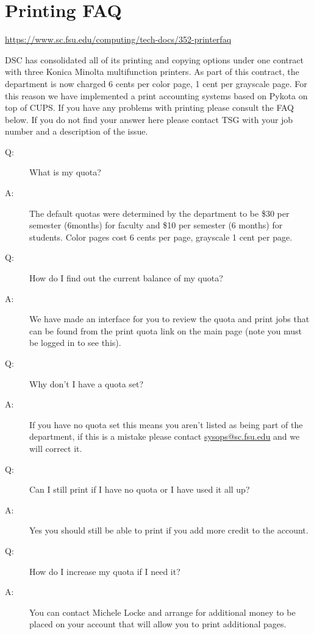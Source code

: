 \documentclass[12pt,a4paper]{article}
\begin{document}
\section{Printing FAQ}
\url{https://www.sc.fsu.edu/computing/tech-docs/352-printerfaq}

DSC has consolidated all of its printing and copying options under one contract with three Konica Minolta multifunction printers. As part of this contract, the department is now charged 6 cents per color page, 1 cent per grayscale page. For this reason we have implemented a print accounting systems based on Pykota on top of CUPS. If you have any problems with printing please consult the FAQ below. If you do not find your answer here please contact TSG with your job number and a description of the issue.

\begin{description}
    \item[Q:] What is my quota?
    \item[A:] The default quotas were determined by the department to be \$30 per semester (6months) for faculty and \$10 per semester (6 months) for students. Color pages cost 6 cents per page, grayscale 1 cent per page.
    
    \item[Q:] How do I find out the current balance of my quota?
    \item[A:] We have made an interface for you to review the quota and print jobs that can be found from the print quota link on the main page (note you must be logged in to see this).
    
    \item[Q:] Why don't I have a quota set?
    \item[A:] If you have no quota set this means you aren't listed as being part of the department, if this is a mistake please contact \href{mailto:sysops@sc.fsu.edu}{sysops@sc.fsu.edu} and we will correct it.
    
    \item[Q:] Can I still print if I have no quota or I have used it all up?
    \item[A:] Yes you should still be able to print if you add more credit to the account.
    
    \item[Q:] How do I increase my quota if I need it?
    \item[A:] You can contact Michele Locke and arrange for additional money to be placed on your account that will allow you to print additional pages.
    

\end{description}
\end{document}
